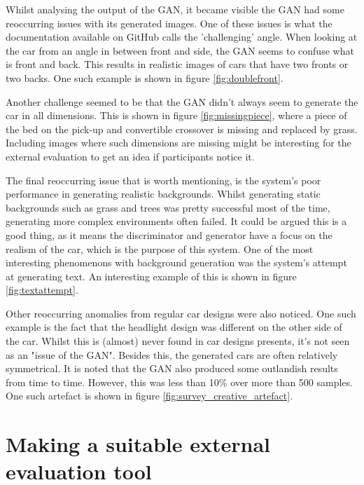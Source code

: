 Whilst analysing the output of the GAN, it became visible the GAN had some reoccurring issues with its generated images.
One of these issues is what the documentation available on GitHub calls the 'challenging' angle.
When looking at the car from an angle in between front and side, the GAN seems to confuse what is front and back.
This results in realistic images of cars that have two fronts or two backs.
One such example is shown in figure \ref{fig:doublefront}.

Another challenge seemed to be that the GAN didn't always seem to generate the car in all dimensions.
This is shown in figure \ref{fig:missingpiece}, where a piece of the bed on the pick-up and convertible crossover is missing and replaced by grass.
Including images where such dimensions are missing might be interesting for the external evaluation to get an idea if participants notice it. 

The final reoccurring issue that is worth mentioning, is the system's poor performance in generating realistic backgrounds.
Whilst generating static backgrounds such as grass and trees was pretty successful most of the time, generating more complex environments often failed.
It could be argued this is a good thing, as it means the discriminator and generator have a focus on the realism of the car, which is the purpose of this system.
One of the most interesting phenomenons with background generation was the system's attempt at generating text.
An interesting example of this is shown in figure \ref{fig:textattempt}.

Other reoccurring anomalies from regular car designs were also noticed.
One such example is the fact that the headlight design was different on the other side of the car.
Whilst this is (almost) never found in car designs presents, it's not seen as an "issue of the GAN".
Besides this, the generated cars are often relatively symmetrical.
It is noted that the GAN also produced some outlandish results from time to time.
However, this was less than 10\% over more than 500 samples.
One such artefact is shown in figure \ref{fig:survey_creative_artefact}.



\clearpage
\section{Making a suitable external evaluation tool}
\label{sec:external_evaluation_tool}

